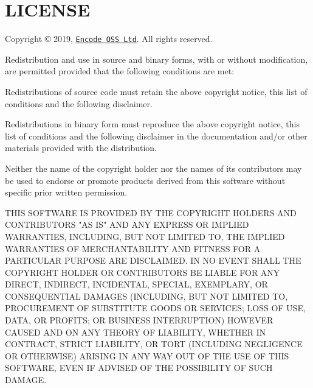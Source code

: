 \chapter{LICENSE }
\hypertarget{md_venv_2lib_2python3_812_2site-packages_2httpx-0_828_81_8dist-info_2licenses_2LICENSE}{}\label{md_venv_2lib_2python3_812_2site-packages_2httpx-0_828_81_8dist-info_2licenses_2LICENSE}
Copyright © 2019, \href{https://www.encode.io/}{\texttt{Encode OSS Ltd}}. All rights reserved.

Redistribution and use in source and binary forms, with or without modification, are permitted provided that the following conditions are met:\+


\begin{DoxyItemize}
\item Redistributions of source code must retain the above copyright notice, this list of conditions and the following disclaimer.
\item Redistributions in binary form must reproduce the above copyright notice, this list of conditions and the following disclaimer in the documentation and/\+or other materials provided with the distribution.
\item Neither the name of the copyright holder nor the names of its contributors may be used to endorse or promote products derived from this software without specific prior written permission.
\end{DoxyItemize}

THIS SOFTWARE IS PROVIDED BY THE COPYRIGHT HOLDERS AND CONTRIBUTORS "{}\+AS IS"{} AND ANY EXPRESS OR IMPLIED WARRANTIES, INCLUDING, BUT NOT LIMITED TO, THE IMPLIED WARRANTIES OF MERCHANTABILITY AND FITNESS FOR A PARTICULAR PURPOSE ARE DISCLAIMED. IN NO EVENT SHALL THE COPYRIGHT HOLDER OR CONTRIBUTORS BE LIABLE FOR ANY DIRECT, INDIRECT, INCIDENTAL, SPECIAL, EXEMPLARY, OR CONSEQUENTIAL DAMAGES (INCLUDING, BUT NOT LIMITED TO, PROCUREMENT OF SUBSTITUTE GOODS OR SERVICES; LOSS OF USE, DATA, OR PROFITS; OR BUSINESS INTERRUPTION) HOWEVER CAUSED AND ON ANY THEORY OF LIABILITY, WHETHER IN CONTRACT, STRICT LIABILITY, OR TORT (INCLUDING NEGLIGENCE OR OTHERWISE) ARISING IN ANY WAY OUT OF THE USE OF THIS SOFTWARE, EVEN IF ADVISED OF THE POSSIBILITY OF SUCH DAMAGE. 